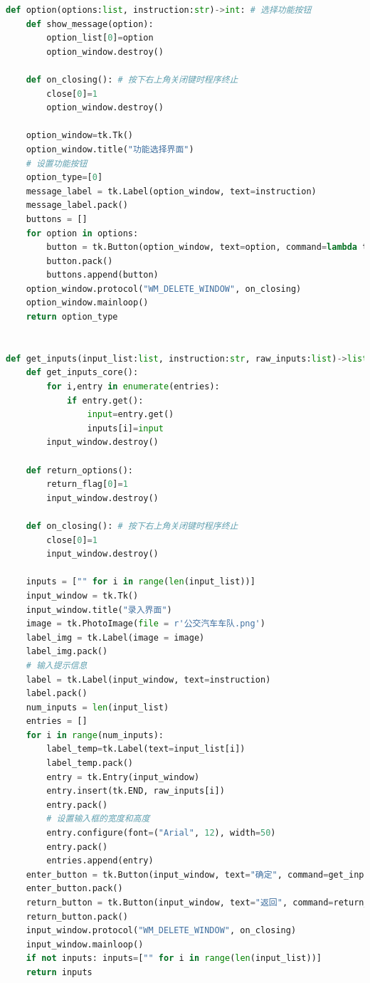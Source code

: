 \documentclass {article}
\begin{document}
\begin{lstlisting}[language=python]
def option(options:list, instruction:str)->int: # 选择功能按钮
    def show_message(option):
        option_list[0]=option
        option_window.destroy()

    def on_closing(): # 按下右上角关闭键时程序终止
        close[0]=1
        option_window.destroy()

    option_window=tk.Tk()
    option_window.title("功能选择界面")
    # 设置功能按钮
    option_type=[0]
    message_label = tk.Label(option_window, text=instruction)
    message_label.pack()
    buttons = []
    for option in options:
        button = tk.Button(option_window, text=option, command=lambda text=option: show_message(text))
        button.pack()
        buttons.append(button)
    option_window.protocol("WM_DELETE_WINDOW", on_closing)
    option_window.mainloop()    
    return option_type


def get_inputs(input_list:list, instruction:str, raw_inputs:list)->list: # 生成可视化的输入框UI界面并接收输入信息
    def get_inputs_core():
        for i,entry in enumerate(entries):
            if entry.get(): 
                input=entry.get()
                inputs[i]=input
        input_window.destroy()
    
    def return_options():
        return_flag[0]=1
        input_window.destroy()
        
    def on_closing(): # 按下右上角关闭键时程序终止
        close[0]=1
        input_window.destroy()
    
    inputs = ["" for i in range(len(input_list))]
    input_window = tk.Tk()
    input_window.title("录入界面")
    image = tk.PhotoImage(file = r'公交汽车车队.png')
    label_img = tk.Label(image = image)
    label_img.pack()
    # 输入提示信息
    label = tk.Label(input_window, text=instruction)
    label.pack()
    num_inputs = len(input_list)
    entries = []
    for i in range(num_inputs):
        label_temp=tk.Label(text=input_list[i])
        label_temp.pack()
        entry = tk.Entry(input_window)
        entry.insert(tk.END, raw_inputs[i])
        entry.pack()
        # 设置输入框的宽度和高度
        entry.configure(font=("Arial", 12), width=50)
        entry.pack()
        entries.append(entry)
    enter_button = tk.Button(input_window, text="确定", command=get_inputs_core)
    enter_button.pack()
    return_button = tk.Button(input_window, text="返回", command=return_options)
    return_button.pack()
    input_window.protocol("WM_DELETE_WINDOW", on_closing)
    input_window.mainloop()
    if not inputs: inputs=["" for i in range(len(input_list))]
    return inputs


\end{lstlisting}
\end{document}
